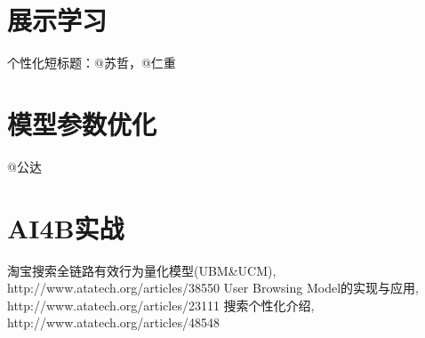 \section{展示学习}
	个性化短标题：@苏哲，@仁重 

\section{模型参数优化} 
	@公达

\section{AI4B实战} 

\begin{thebibliography}{99}
 淘宝搜索全链路有效行为量化模型(UBM\&UCM), http://www.atatech.org/articles/38550
 User Browsing Model的实现与应用, http://www.atatech.org/articles/23111
 搜索个性化介绍, http://www.atatech.org/articles/48548
\end{thebibliography}

 
